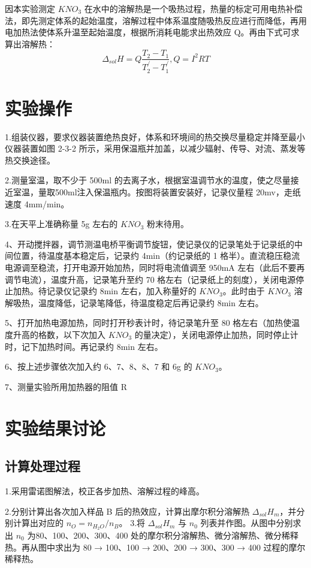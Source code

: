 \documentclass[4pt,a4papper]{article}
\begin{document}
因本实验测定 $KNO_3$ 在水中的溶解热是一个吸热过程，热量的标定可用电热补偿法，即先测定体系的起始温度，溶解过程中体系温度随吸热反应进行而降低，再用电加热法使体系升温至起始温度，根据所消耗电能求出热效应 Q。再由下式可求算出溶解热：
$$\Delta_{sol}H = Q\frac{T_2 - T_1}{T_2^{/}-T_1^{/}}, Q=I^2RT$$

\section{实验操作}
1.组装仪器，要求仪器装置绝热良好，体系和环境间的热交换尽量稳定并降至最小仪器装置如图 2-3-2 所示，采用保温瓶并加盖，以减少辐射、传导、对流、蒸发等热交换途径。 

2.测量室温，取不少于 500ml 的去离子水，根据室温调节水的温度，使之尽量接近室温，量取500ml注入保温瓶内。按图将装置安装好，记录仪量程 20mv，走纸速度 4mm/min。 

3.在天平上准确称量 5g 左右的 $KNO_3$ 粉末待用。

4、开动搅拌器，调节测温电桥平衡调节旋钮，使记录仪的记录笔处于记录纸的中间位置，待温度基本稳定后，记录约 4min（约记录纸的 1 格半）。直流稳压稳流电源调至稳流，打开电源开始加热，同时将电流值调至 950mA 左右（此后不要再调节电流），温度升高，记录笔升至约 70 格左右（记录纸上的刻度），关闭电源停止加热。待记录仪记录约 8min 左右，加入称量好的 $KNO_3$。此时由于 $KNO_3$ 溶解吸热，温度降低，记录笔降低，待温度稳定后再记录约 8min 左右。

5、打开加热电源加热，同时打开秒表计时，待记录笔升至 80 格左右（加热使温度升高的格数，以下次加入 $KNO_3$ 的量决定），关闭电源停止加热，同时停止计时，记下加热时间。再记录约 8min 左右。

6、按上述步骤依次加入约 6、7、8、8、7 和 6g 的 $KNO_3$。 

7、测量实验所用加热器的阻值 R


\section{实验结果讨论}
\subsection{计算处理过程}
1.采用雷诺图解法，校正各步加热、溶解过程的峰高。

2.分别计算出各次加入样品 B 后的热效应，计算出摩尔积分溶解热 $\Delta_{sol}H_m$，并分别计算出对应的 $n_O = n_{H_2O}/n_B$。
3.将 $\Delta_{sol}H_m$ 与 $n_0$ 列表并作图。从图中分别求出 $n_0$ 为80、100、200、300、400 处的摩尔积分溶解热、微分溶解热、微分稀释热。再从图中求出为 80 → 100、100 → 200、200 → 300、300 → 400 过程的摩尔稀释热。
\end{document}
